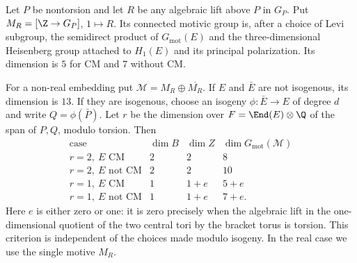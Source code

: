 \begin{proposition}\hypertarget{tag-001C}{}\label{ari:C.7.3}

Let $P$ be nontorsion and let $R$ be any algebraic lift above
$P$ in $G_P$. Put $M_R=[\Z\to G_P]$, $1\mapsto R$.
Its connected motivic group is, after a choice of Levi subgroup,
the semidirect product of $G_{\mathrm{mot}}(E)$ and the
three-dimensional Heisenberg group attached to $H_1(E)$ and
its principal polarization. Its dimension is $5$ for CM and
$7$ without CM.

For a non-real embedding put
$\mathcal M=M_R\oplus\overline{M_R}$.
If $E$ and $\bar E$ are not isogenous, its dimension is $13$.
If they are isogenous, choose an isogeny
$\phi:\bar E\to E$ of degree $d$ and write
$Q=\phi(\bar P)$. Let $r$ be the dimension over
$F=\End(E)\otimes\Q$ of the span of $P,Q$, modulo torsion.
Then
\[
\begin{array}{c|c|c|c}
\text{case}&\dim B&\dim Z&\dim G_{\mathrm{mot}}(\mathcal M)\\ \hline
r=2,\ E\text{ CM}&2&2&8\\
r=2,\ E\text{ not CM}&2&2&10\\
r=1,\ E\text{ CM}&1&1+e&5+e\\
r=1,\ E\text{ not CM}&1&1+e&7+e.
\end{array}
\]
Here $e$ is either zero or one: it is zero precisely when the
algebraic lift in the one-dimensional quotient of the two
central tori by the bracket torus is torsion. This criterion is
independent of the choices made modulo isogeny. In the real
case we use the single motive $M_R$.
\end{proposition}


